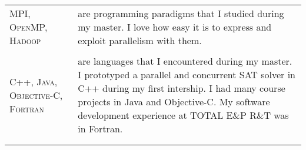 \begin{tabular}{p{2cm}|p{11cm}}

\textsc{MPI, OpenMP, Hadoop} & are programming paradigms that I studied during my master. I love how easy it is to express and exploit parallelism with them.\\
\multicolumn{2}{c}{} \\

\textsc{C++, \newline Java, Objective-C, Fortran} & are languages that I encountered during my master.
I prototyped a parallel and concurrent SAT solver in C++ during my first intership.
I had many course projects in Java and Objective-C.
My software development experience at \textsc{TOTAL E\&P R\&T} was in Fortran.\\
\multicolumn{2}{c}{} \\

\multicolumn{2}{c}{} \\

\end{tabular}
